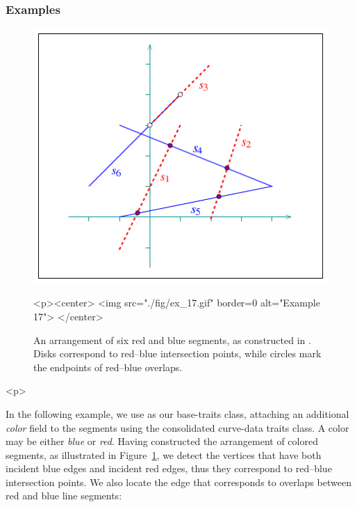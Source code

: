 \subsubsection{Examples}
%
\begin{figure}[!htp]
\begin{ccTexOnly}
  \begin{center}
  \includegraphics{Arrangement_2/fig/ex_17}
  \end{center}
\end{ccTexOnly}
\begin{ccHtmlOnly}
  <p><center>
  <img src="./fig/ex_17.gif" border=0 alt="Example 17">
  </center>
\end{ccHtmlOnly}
\caption{An arrangement of six red and blue segments, as
constructed in . Disks correspond to
red--blue intersection points, while circles mark the endpoints
of red--blue overlaps.}
\label{arr_fig:ex_17}
\end{figure}

\begin{ccHtmlOnly}<p>\end{ccHtmlOnly}
In the following example, we use  as our
base-traits class, attaching an additional {\em color} field to
the segments using the consolidated curve-data traits class. A
color may be either {\em blue} or {\em red}. Having constructed
the arrangement of colored segments, as illustrated in
Figure~\ref{arr_fig:ex_17}, we detect the vertices that have both
incident blue edges and incident red edges, thus they correspond
to red--blue intersection points. We also locate the edge that
corresponds to overlaps between red and blue line segments:

